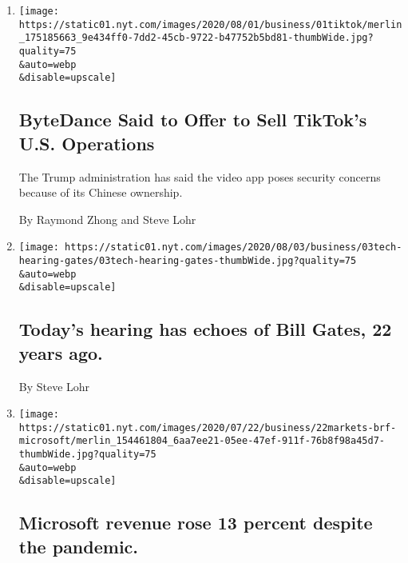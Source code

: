 \begin{enumerate}
\def\labelenumi{\arabic{enumi}.}
\item
  \href{/2020/08/01/technology/tiktok-sale-trump-ban.html}{}

  \texttt{[image: https://static01.nyt.com/images/2020/08/01/business/01tiktok/merlin\_175185663\_9e434ff0-7dd2-45cb-9722-b47752b5bd81-thumbWide.jpg?quality=75\\\&auto=webp\\\&disable=upscale]}

  \hypertarget{bytedance-said-to-offer-to-sell-tiktoks-us-operations}{%
  \subsection{ByteDance Said to Offer to Sell TikTok's U.S.
  Operations}\label{bytedance-said-to-offer-to-sell-tiktoks-us-operations}}

  The Trump administration has said the video app poses security
  concerns because of its Chinese ownership.

  By Raymond Zhong and Steve Lohr
\item
  \href{/live/2020/07/29/technology/tech-ceos-hearing-testimony/todays-hearing-has-echoes-of-bill-gates-22-years-ago}{}

  \texttt{[image: https://static01.nyt.com/images/2020/08/03/business/03tech-hearing-gates/03tech-hearing-gates-thumbWide.jpg?quality=75\\\&auto=webp\\\&disable=upscale]}

  \hypertarget{todays-hearing-has-echoes-of-bill-gates-22-years-ago}{%
  \subsection{Today's hearing has echoes of Bill Gates, 22 years
  ago.}\label{todays-hearing-has-echoes-of-bill-gates-22-years-ago}}

  By Steve Lohr
\item
  \href{/live/2020/07/22/business/stock-market-today-coronavirus/microsoft-earnings}{}

  \texttt{[image: https://static01.nyt.com/images/2020/07/22/business/22markets-brf-microsoft/merlin\_154461804\_6aa7ee21-05ee-47ef-911f-76b8f98a45d7-thumbWide.jpg?quality=75\\\&auto=webp\\\&disable=upscale]}

  \hypertarget{microsoft-revenue-rose-13-percent-despite-the-pandemic}{%
  \subsection{Microsoft revenue rose 13 percent despite the
  pandemic.}\label{microsoft-revenue-rose-13-percent-despite-the-pandemic}}


\end{enumerate}
